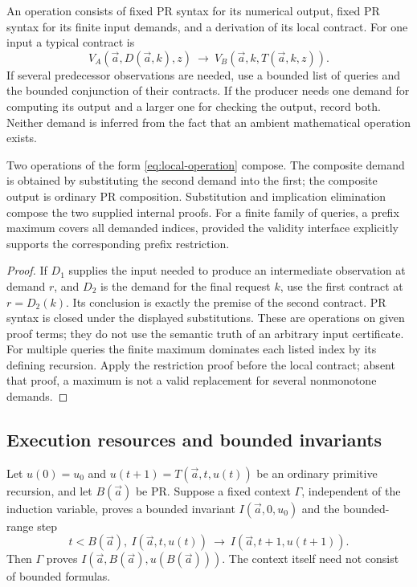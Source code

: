 An operation consists of fixed PR syntax for its numerical output,
fixed PR syntax for its finite input demands, and a derivation of its
local contract. For one input a typical contract is
\begin{equation}\label{eq:local-operation}
 V_A(\vec a,D(\vec a,k),z)
 \ \longrightarrow\
 V_B(\vec a,k,T(\vec a,k,z)).
\end{equation}
If several predecessor observations are needed, use a bounded list of
queries and the bounded conjunction of their contracts. If the producer
needs one demand for computing its output and a larger one for checking
the output, record both. Neither demand is inferred from the fact that
an ambient mathematical operation exists.

\begin{proposition}
\label{prop:composition}
Two operations of the form \eqref{eq:local-operation} compose. The
composite demand is obtained by substituting the second demand into the
first; the composite output is ordinary PR composition. Substitution
and implication elimination compose the two supplied internal proofs.
For a finite family of queries, a prefix maximum covers all demanded
indices, provided the validity interface explicitly supports the
corresponding prefix restriction.
\end{proposition}

\begin{proof}
If \(D_1\) supplies the input needed to produce an intermediate
observation at demand \(r\), and \(D_2\) is the demand for the final
request \(k\), use the first contract at \(r=D_2(k)\). Its conclusion
is exactly the premise of the second contract. PR syntax is closed
under the displayed substitutions. These are operations on given proof
terms; they do not use the semantic truth of an arbitrary input
certificate. For multiple queries the finite maximum dominates each
listed index by its defining recursion. Apply the restriction proof
before the local contract; absent that proof, a maximum is not a valid
replacement for several nonmonotone demands.
\end{proof}

\subsection{Execution resources and bounded invariants}

\begin{lemma}
\label{lem:execution}
Let \(u(0)=u_0\) and \(u(t+1)=T(\vec a,t,u(t))\) be an ordinary
primitive recursion, and let \(B(\vec a)\) be PR. Suppose a fixed context
\(\Gamma\), independent of the induction variable, proves a bounded
invariant \(I(\vec a,0,u_0)\) and the bounded-range step
\[
 t<B(\vec a),\ I(\vec a,t,u(t))
       \ \longrightarrow\ I(\vec a,t+1,u(t+1)).
\]
Then \(\Gamma\) proves \(I(\vec a,B(\vec a),u(B(\vec a)))\).
The context itself need not consist of bounded formulas.
\end{lemma}

